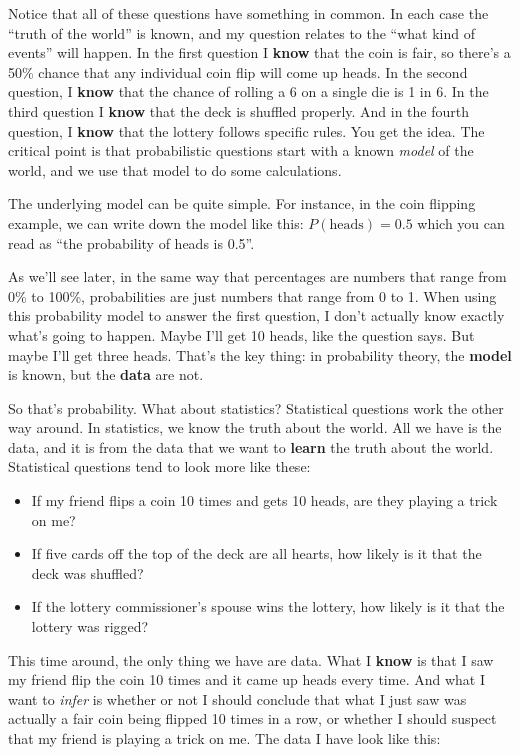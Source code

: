 \documentclass[
]{book}
\begin{document}
Notice that all of these questions have something in common. In each case the ``truth of the world'' is known, and my question relates to the ``what kind of events'' will happen. In the first question I \textbf{know} that the coin is fair, so there's a 50\% chance that any individual coin flip will come up heads. In the second question, I \textbf{know} that the chance of rolling a 6 on a single die is 1 in 6. In the third question I \textbf{know} that the deck is shuffled properly. And in the fourth question, I \textbf{know} that the lottery follows specific rules. You get the idea. The critical point is that probabilistic questions start with a known \emph{model} of the world, and we use that model to do some calculations.

The underlying model can be quite simple. For instance, in the coin flipping example, we can write down the model like this: \(P(\mbox{heads}) = 0.5\) which you can read as ``the probability of heads is 0.5''.

As we'll see later, in the same way that percentages are numbers that range from 0\% to 100\%, probabilities are just numbers that range from 0 to 1. When using this probability model to answer the first question, I don't actually know exactly what's going to happen. Maybe I'll get 10 heads, like the question says. But maybe I'll get three heads. That's the key thing: in probability theory, the \textbf{model} is known, but the \textbf{data} are not.

So that's probability. What about statistics? Statistical questions work the other way around. In statistics, we know the truth about the world. All we have is the data, and it is from the data that we want to \textbf{learn} the truth about the world. Statistical questions tend to look more like these:

\begin{itemize}
\item
  If my friend flips a coin 10 times and gets 10 heads, are they playing a trick on me?
\item
  If five cards off the top of the deck are all hearts, how likely is it that the deck was shuffled?
\item
  If the lottery commissioner's spouse wins the lottery, how likely is it that the lottery was rigged?
\end{itemize}

This time around, the only thing we have are data. What I \textbf{know} is that I saw my friend flip the coin 10 times and it came up heads every time. And what I want to \emph{infer} is whether or not I should conclude that what I just saw was actually a fair coin being flipped 10 times in a row, or whether I should suspect that my friend is playing a trick on me. The data I have look like this:
\end{document}
